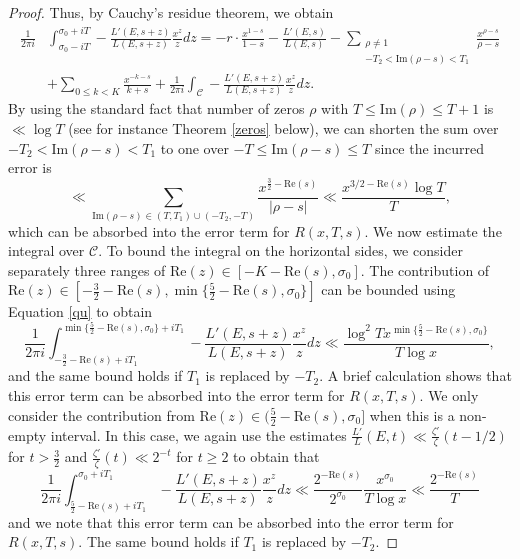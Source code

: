 \documentclass[12pt,reqno]{amsart}
\theoremstyle{definition}
\numberwithin{equation}{section}
\renewcommand{\Im}{\mathrm{Im}}
\renewcommand{\Re}{\mathrm{Re}}
\begin{document}
\begin{proof}
Thus, by Cauchy's residue theorem, we obtain
\begin{align} \label{perron2}
\frac{1}{2 \pi i} & \int_{\sigma_0- i T}^{\sigma_0+ i T}  - \frac{L'(E, s+z)}{L(E, s+z)} \frac{x^z}{z} dz  = -r \cdot \frac{x^{1-s}}{1-s}-\frac{L'(E, s)}{L(E, s)}  -\sum_{\substack{\rho \neq 1 \\ -T_2 < \Im (\rho -s) < T_1}}\frac{x^{\rho-s}}{\rho-s} \nonumber \\ & + \sum_{0 \leq k <K} \frac{x^{-k-s}}{k+s}+   \frac{1}{2 \pi i} \int_{\mathcal C} - \frac{L'(E, s+z)}{L(E, s+z)} \frac{x^z}{z} dz. 
\end{align}
By using the standard fact that number of zeros $\rho$ with $T \leq  \Im(\rho) \leq T+1$ is $ \ll \log T$ (see for instance Theorem \ref{zeros} below), we can shorten the sum over $-T_2< \Im(\rho-s) <T_1$ to one over $-T \leq \Im(\rho-s) \leq T$ since the incurred error is 
$$
\ll \sum_{\Im(\rho-s) \in (T, T_1) \cup (-T_2, -T)} \frac{x^{\frac{3}{2}-\Re(s)}}{|\rho-s|} \ll \frac{x^{3/2-\Re(s)} \log T}{T},
$$
which can be absorbed into the error term for $R(x, T, s)$. We now estimate the integral over $\mathcal C$. To bound the integral on the horizontal sides, we consider separately three ranges of $\Re(z) \in [-K-\Re(s), \sigma_0]$. The contribution of $\Re(z) \in \left [-\frac{3}{2}-\Re(s), \min\{\frac{5}{2}-\Re(s), \sigma_0 \} \right]$ can be bounded using Equation \eqref{qu} to obtain 
\begin{equation*} 
\frac{1}{2 \pi i} \int_{-\frac{3}{2}-\Re(s)+iT_1}^{ \min\{\frac{5}{2}-\Re(s), \sigma_0 \}+iT_1} - \frac{L'(E, s+z)}{L(E, s+z)} \frac{x^z}{z} dz \ll \frac{\log^2 T x^{\min\{\frac{5}{2}-\Re(s), \sigma_0 \}}}{T \log x},
\end{equation*}
and the same bound holds if $T_1$ is replaced by $-T_2$. A brief calculation shows that this error term can be absorbed into the error term for $R(x, T, s)$. We  only consider the contribution from $\Re(z) \in (\frac{5}{2}-\Re(s), \sigma_0]$ when this is a non-empty interval. In this case, we again use the estimates $\frac{L'}{L}(E, t) \ll \frac{\zeta'}{\zeta}(t-1/2)$ for $t > \frac{3}{2}$ and $\frac{\zeta'}{\zeta}(t) \ll 2^{-t}$ for $t\geq 2$ to obtain that 
\begin{equation*}
\frac{1}{2 \pi i} \int_{\frac{5}{2}-\Re(s)+iT_1}^{\sigma_0+iT_1} - \frac{L'(E, s+z)}{L(E, s+z)} \frac{x^z}{z} dz \ll  \frac{2^{-\Re(s)}}{2^{\sigma_0}} \frac{x^{\sigma_0}}{T \log x} \ll \frac{2^{-\Re(s)}}{T}
\end{equation*}
 and we note that this error term can be absorbed into the error term for $R(x, T, s)$.  The same bound holds if $T_1$ is replaced by $-T_2$.

\end{proof}
\end{document}

